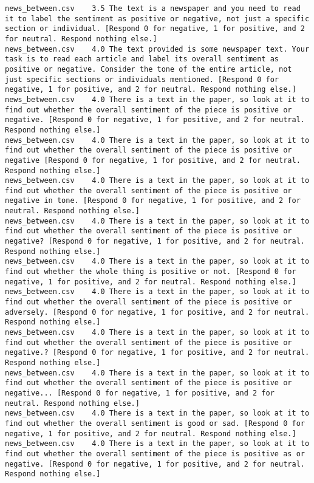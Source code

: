 \begin{lstlisting}
news_between.csv	3.5	The text is a newspaper and you need to read it to label the sentiment as positive or negative, not just a specific section or individual. [Respond 0 for negative, 1 for positive, and 2 for neutral. Respond nothing else.]
news_between.csv	4.0	The text provided is some newspaper text. Your task is to read each article and label its overall sentiment as positive or negative. Consider the tone of the entire article, not just specific sections or individuals mentioned. [Respond 0 for negative, 1 for positive, and 2 for neutral. Respond nothing else.]
news_between.csv	4.0	There is a text in the paper, so look at it to find out whether the overall sentiment of the piece is positive or negative. [Respond 0 for negative, 1 for positive, and 2 for neutral. Respond nothing else.]
news_between.csv	4.0	There is a text in the paper, so look at it to find out whether the overall sentiment of the piece is positive or negative [Respond 0 for negative, 1 for positive, and 2 for neutral. Respond nothing else.]
news_between.csv	4.0	There is a text in the paper, so look at it to find out whether the overall sentiment of the piece is positive or negative in tone. [Respond 0 for negative, 1 for positive, and 2 for neutral. Respond nothing else.]
news_between.csv	4.0	There is a text in the paper, so look at it to find out whether the overall sentiment of the piece is positive or negative? [Respond 0 for negative, 1 for positive, and 2 for neutral. Respond nothing else.]
news_between.csv	4.0	There is a text in the paper, so look at it to find out whether the whole thing is positive or not. [Respond 0 for negative, 1 for positive, and 2 for neutral. Respond nothing else.]
news_between.csv	4.0	There is a text in the paper, so look at it to find out whether the overall sentiment of the piece is positive or adversely. [Respond 0 for negative, 1 for positive, and 2 for neutral. Respond nothing else.]
news_between.csv	4.0	There is a text in the paper, so look at it to find out whether the overall sentiment of the piece is positive or negative.? [Respond 0 for negative, 1 for positive, and 2 for neutral. Respond nothing else.]
news_between.csv	4.0	There is a text in the paper, so look at it to find out whether the overall sentiment of the piece is positive or negative... [Respond 0 for negative, 1 for positive, and 2 for neutral. Respond nothing else.]
news_between.csv	4.0	There is a text in the paper, so look at it to find out whether the overall sentiment is good or sad. [Respond 0 for negative, 1 for positive, and 2 for neutral. Respond nothing else.]
news_between.csv	4.0	There is a text in the paper, so look at it to find out whether the overall sentiment of the piece is positive as or negative. [Respond 0 for negative, 1 for positive, and 2 for neutral. Respond nothing else.]

\end{lstlisting}

